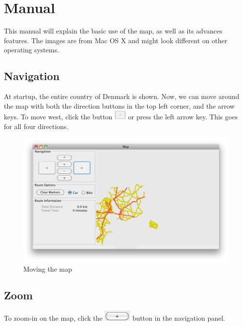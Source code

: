\chapter{Manual}
\label{MAN}

This manual will explain the basic use of the map, as well as its
advances features. The images are from Mac OS X and might look different on other
operating systems.

\section{Navigation}
\label{MAN-N}
At startup, the entire country of Denmark is shown. Now, we can move around the
map with both the direction buttons in the top left corner, and the arrow keys.
To move west, click the button
\includegraphics[height=1.3em]{images/westbutton.png} or press the left arrow
key. This goes for all four directions.

\begin{figure}[h!]
\centering
\includegraphics[width=1\linewidth]{images/man-move.png}
\caption{Moving the map}
\label{MAN-Z-COP}
\end{figure}

\section{Zoom}
\label{MAN-Z}
To zoom-in on the map, click the
\includegraphics[height=1.5em]{images/zoominbutton.png} button in the navigation
panel.

